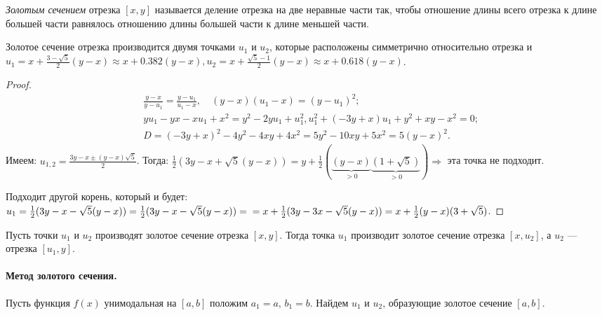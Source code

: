 
\begin{definition}
	\textit{Золотым сечением} отрезка $[x, y]$ называется деление отрезка на две неравные части так, чтобы отношение длины всего отрезка к длине большей части равнялось отношению длины большей части к длине меньшей части. 
\end{definition}

\begin{utv}
	Золотое сечение отрезка производится двумя точками $u_1$ и $u_2$, которые расположены симметрично относительно отрезка и $u_1 = x + \frac{3 - \sqrt{5}}{2} (y - x) \approx x + 0.382 (y - x), u_2 = x + \frac{\sqrt{5} - 1}{2} (y - x) \approx x + 0.618 (y - x)$.
\end{utv}
\begin{proof}
	\begin{align*}
		&\frac{y - x}{y - u_1} = \frac{y - u_1}{u_1 - x}, \quad (y - x) (u_1 - x) = (y - u_1)^2; \\ &y u_1 - y x - x u_1 + x^2 = y^2 - 2 y u_1 + u_1^2,
		u_1^2 + (-3 y + x) u_1 + y^2 + x y - x^2 = 0; \\ &D = (-3 y + x)^2 - 4 y^2 - 4 xy + 4 x^2 = 5 y^2 - 10 xy + 5 x^2 = 5 (y - x)^2.
	\end{align*}
	Имеем: $u_{1, 2} = \frac{3 y - x \pm (y - x) \sqrt{5}}{2}$. Тогда:
	$\frac{1}{2} (3 y - x + \sqrt{5} (y - x)) = y + \frac{1}{2} (\underbrace{(y - x)}_{>0} \underbrace{(1 + \sqrt{5})}_{>0}) \Rightarrow$ эта точка не подходит.
	
	Подходит другой корень, который и будет: $u_1 = \frac{1}{2} (3 y - x - \sqrt{5} (y - x)) = \frac{1}{2} (3 y - x - \sqrt{5} (y - x)) = \\ = x + \frac{1}{2} (3 y - 3 x - \sqrt{5}(y - x)) = x + \frac{1}{2} (y - x) (3 + \sqrt{5})$.
\end{proof}

\begin{utv}
	Пусть точки $u_1$ и $u_2$ производят золотое сечение отрезка $[x, y]$. Тогда точка $u_1$ производит золотое сечение отрезка $[x, u_2]$, а $u_2$ --- отрезка $[u_1, y]$.
\end{utv}

\paragraph{Метод золотого сечения.} Пусть функция $f(x)$ унимодальная на $[a, b]$ положим $a_1 = a, \, b_1 = b$. Найдем $u_1$ и $u_2$, образующие золотое сечение $[a, b]$.

